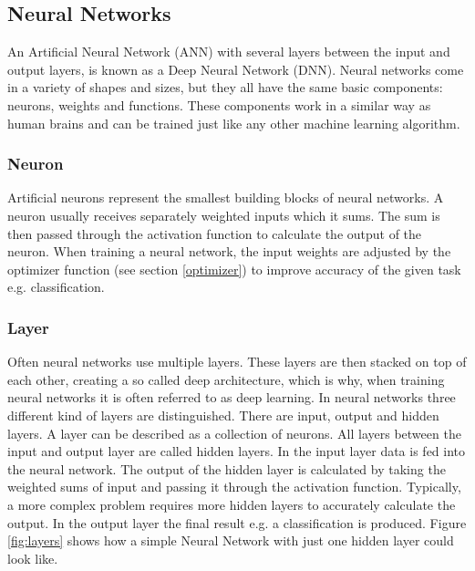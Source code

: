 \subsection{Neural Networks}

An Artificial Neural Network (ANN) with several layers between the input and output layers, is known as a Deep Neural Network (DNN). Neural networks come in a variety of shapes and sizes, but they all have the same basic components: neurons, weights and functions. These components work in a similar way as human brains and can be trained just like any other machine learning algorithm.

\subsubsection{Neuron}
Artificial neurons represent the smallest building blocks of neural networks. A neuron usually receives separately weighted inputs which it sums. The sum is then passed through the activation function to calculate the output of the neuron. When training a neural network, the input weights are adjusted by the optimizer function (see section \ref{optimizer}) to improve accuracy of the given task e.g. classification.

\subsubsection{Layer}
Often neural networks use multiple layers. These layers are then stacked on top of each other, creating a so called deep architecture, which is why, when training neural networks it is often referred to as deep learning. In neural networks three different kind of layers are distinguished. There are input, output and hidden layers. A layer can be described as a collection of neurons. All layers between the input and output layer are called hidden layers. In the input layer data is fed into the neural network. The output of the hidden layer is calculated by taking the weighted sums of input and passing it through the activation function. Typically, a more complex problem requires more hidden layers to accurately calculate the output. In the output layer the final result e.g. a classification is produced. Figure \ref{fig:layers} shows how a simple Neural Network with just one hidden layer could look like.


